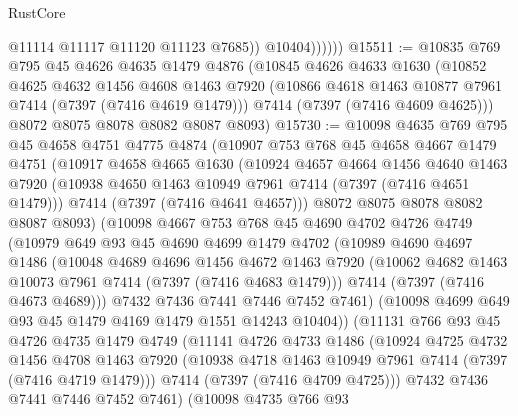 \begin{lexlean}{RustCore}
\begin{coremodule}
                    @11114
                    @11117
                    @11120
                    @11123
                    @7685))
                @10404))))))
@15511 := @10835
    @769
    @795
    @45
    @4626
    @4635
    @1479
    @4876
    (@10845
      @4626
      @4633
      @1630
      (@10852
        @4625
        @4632
        @1456
        @4608
        @1463
        @7920
        (@10866 @4618 @1463 @10877 @7961 @7414 (@7397 (@7416 @4619 @1479)))
        @7414
        (@7397 (@7416 @4609 @4625)))
      @8072
      @8075
      @8078
      @8082
      @8087
      @8093)
@15730 := @10098
    @4635
    @769
    @795
    @45
    @4658
    @4751
    @4775
    @4874
    (@10907
      @753
      @768
      @45
      @4658
      @4667
      @1479
      @4751
      (@10917
        @4658
        @4665
        @1630
        (@10924
          @4657
          @4664
          @1456
          @4640
          @1463
          @7920
          (@10938 @4650 @1463 @10949 @7961 @7414 (@7397 (@7416 @4651 @1479)))
          @7414
          (@7397 (@7416 @4641 @4657)))
        @8072
        @8075
        @8078
        @8082
        @8087
        @8093)
      (@10098
        @4667
        @753
        @768
        @45
        @4690
        @4702
        @4726
        @4749
        (@10979
          @649
          @93
          @45
          @4690
          @4699
          @1479
          @4702
          (@10989
            @4690
            @4697
            @1486
            (@10048
              @4689
              @4696
              @1456
              @4672
              @1463
              @7920
              (@10062 @4682 @1463 @10073 @7961 @7414 (@7397 (@7416 @4683 @1479)))
              @7414
              (@7397 (@7416 @4673 @4689)))
            @7432
            @7436
            @7441
            @7446
            @7452
            @7461)
          (@10098 @4699 @649 @93 @45 @1479 @4169 @1479 @1551 @14243 @10404))
        (@11131
          @766
          @93
          @45
          @4726
          @4735
          @1479
          @4749
          (@11141
            @4726
            @4733
            @1486
            (@10924
              @4725
              @4732
              @1456
              @4708
              @1463
              @7920
              (@10938 @4718 @1463 @10949 @7961 @7414 (@7397 (@7416 @4719 @1479)))
              @7414
              (@7397 (@7416 @4709 @4725)))
            @7432
            @7436
            @7441
            @7446
            @7452
            @7461)
          (@10098
            @4735
            @766
            @93

\end{coremodule}
\end{lexlean}
